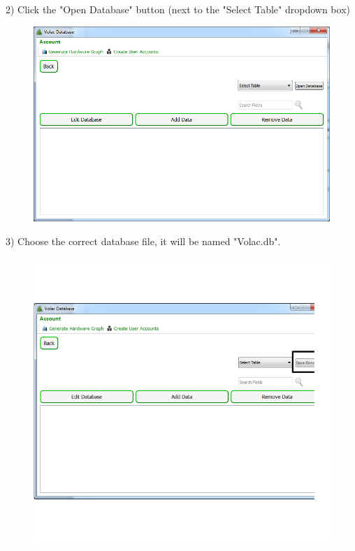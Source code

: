 2) Click the "Open Database"  button (next to the "Select Table" dropdown box)

\begin{figure}[H]
    \includegraphics[width=\textwidth]{./Manual/Images/opendb2.png}
\end{figure}


3) Choose the correct database file, it will be named "Volac.db". 

\begin{figure}[H]
    \includegraphics[width=\textwidth]{./Manual/Images/opendb3.png}
\end{figure}

